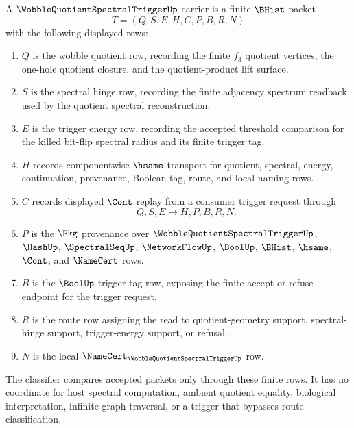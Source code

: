 \begin{definition}
\label{def:wobble-quotient-spectral-trigger-carrier}
A $\WobbleQuotientSpectralTriggerUp$ carrier is a finite $\BHist$ packet
$$
T=(Q,S,E,H,C,P,B,R,N)
$$
with the following displayed rows:
\begin{enumerate}
\item $Q$ is the wobble quotient row, recording the finite $f_{3}$ quotient vertices, the one-hole quotient closure, and the quotient-product lift surface.
\item $S$ is the spectral hinge row, recording the finite adjacency spectrum readback used by the quotient spectral reconstruction.
\item $E$ is the trigger energy row, recording the accepted threshold comparison for the killed bit-flip spectral radius and its finite trigger tag.
\item $H$ records componentwise $\hsame$ transport for quotient, spectral, energy, continuation, provenance, Boolean tag, route, and local naming rows.
\item $C$ records displayed $\Cont$ replay from a consumer trigger request through
$$
Q,S,E \longmapsto H,P,B,R,N .
$$
\item $P$ is the $\Pkg$ provenance over $\WobbleQuotientSpectralTriggerUp$, $\HashUp$, $\SpectralSeqUp$, $\NetworkFlowUp$, $\BoolUp$, $\BHist$, $\hsame$, $\Cont$, and $\NameCert$ rows.
\item $B$ is the $\BoolUp$ trigger tag row, exposing the finite accept or refuse endpoint for the trigger request.
\item $R$ is the route row assigning the read to quotient-geometry support, spectral-hinge support, trigger-energy support, or refusal.
\item $N$ is the local $\NameCert_{\WobbleQuotientSpectralTriggerUp}$ row.
\end{enumerate}
The classifier compares accepted packets only through these finite rows. It has no coordinate for host spectral computation, ambient quotient equality, biological interpretation, infinite graph traversal, or a trigger that bypasses route classification.
\end{definition}

